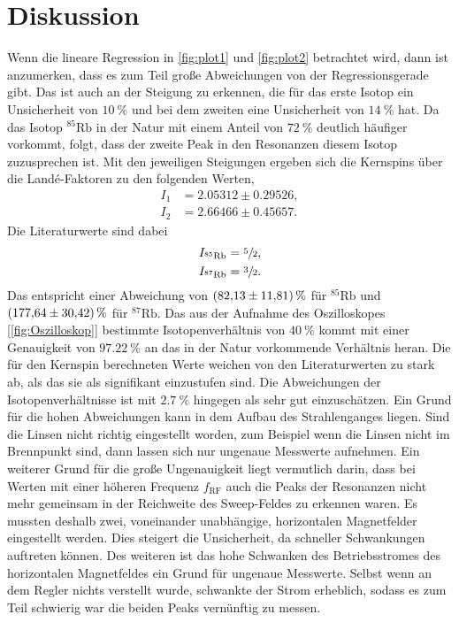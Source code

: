 \section{Diskussion}
\label{sec:Diskussion}

Wenn die lineare Regression in \autoref{fig:plot1} und \autoref{fig:plot2} betrachtet wird, dann ist anzumerken, dass es zum Teil große Abweichungen von der Regressionsgerade gibt.
Das ist auch an der Steigung zu erkennen, die für das erste Isotop ein Unsicherheit von $\SI{10}{\percent}$ und bei dem zweiten eine Unsicherheit von $\SI{14}{\percent}$ hat.
Da das Isotop $^{85}\text{Rb}$ in der Natur mit einem Anteil von $\SI{72}{\percent}$ deutlich häufiger vorkommt, folgt, dass der zweite Peak in den Resonanzen diesem Isotop 
zuzusprechen ist. Mit den jeweiligen Steigungen ergeben sich die Kernspins über die Landé-Faktoren zu den folgenden Werten,
\begin{align*}
    I_1 &= 2.05312 \pm 0.29526, \\
    I_2 &= 2.66466 \pm 0.45657.
\end{align*}
Die Literaturwerte \cite{RubidiumSpin} sind dabei
\begin{align*}
    I_{^{85}\text{Rb}} &= \sfrac52, \\
    I_{^{87}\text{Rb}} &= \sfrac32.
\end{align*}
Das entspricht einer Abweichung von $\SI{82.13\pm 11.81}{\percent}$ für $^{85}\text{Rb}$ und $\SI{177.64\pm 30.42}{\percent}$ für $^{87}\text{Rb}$. 
Das aus der Aufnahme des Oszilloskopes [\ref{fig:Oszilloskop}] bestimmte Isotopenverhältnis von  $\SI{40}{\percent}$ kommt mit einer Genauigkeit von $\SI{97.22}{\percent}$ an das in
der Natur vorkommende Verhältnis heran. \newline
Die für den Kernspin berechneten Werte weichen von den Literaturwerten zu stark ab, als das sie als signifikant einzustufen sind. Die Abweichungen der Isotopenverhältnisse ist mit $\SI{2.7}{\percent}$ hingegen als sehr gut einzuschätzen.
Ein Grund für die hohen Abweichungen kann in dem Aufbau des Strahlenganges liegen. Sind die Linsen nicht richtig eingestellt worden, zum Beispiel wenn die Linsen nicht im Brennpunkt sind, dann
lassen sich nur ungenaue Messwerte aufnehmen.
Ein weiterer Grund für die große Ungenauigkeit liegt vermutlich darin, dass bei Werten mit einer höheren Frequenz $f_{\text{RF}}$ auch die Peaks der Resonanzen nicht mehr gemeinsam
in der Reichweite des Sweep-Feldes zu erkennen waren. Es mussten deshalb zwei, voneinander unabhängige, horizontalen Magnetfelder eingestellt werden. Dies steigert die Unsicherheit, da
schneller Schwankungen auftreten können.
Des weiteren ist das hohe Schwanken des Betriebsstromes des horizontalen Magnetfeldes ein Grund für ungenaue Messwerte. Selbst wenn an dem Regler nichts verstellt wurde,
schwankte der Strom erheblich, sodass es zum Teil schwierig war die beiden Peaks vernünftig zu messen.